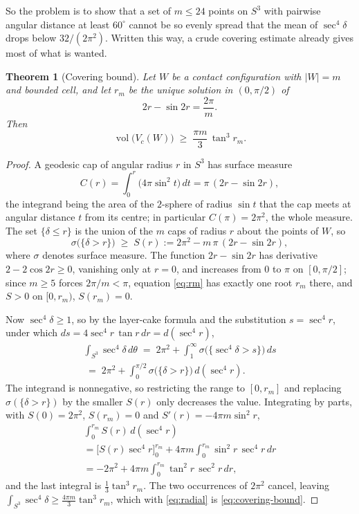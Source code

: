 \documentclass[11pt,reqno]{amsart}
\renewcommand{\_}{\origunderscore\allowbreak}
\numberwithin{equation}{section}
\theoremstyle{plain}
\newtheorem{thm}{Theorem}[section]
\theoremstyle{definition}
\theoremstyle{remark}
\DeclareMathOperator{\vol}{vol}
\begin{document}
So the problem is to show that a set of $m\le24$ points on $S^3$ with
pairwise angular distance at least $60^\circ$ cannot be so evenly spread
that the mean of $\sec^4\delta$ drops below $32/(2\pi^2)$. Written this
way, a crude covering estimate already gives most of what is wanted.

\begin{thm}[Covering bound]\label{thm:covering-bound}
Let $W$ be a contact configuration with $|W|=m$ and bounded cell, and
let $r_m$ be the unique solution in $(0,\pi/2)$ of
\begin{equation}\label{eq:rm}
  2r-\sin2r=\frac{2\pi}{m} .
\end{equation}
Then
\begin{equation}\label{eq:covering-bound}
  \vol\bigl(V_c(W)\bigr)\;\ge\;\frac{\pi m}{3}\,\tan^3 r_m .
\end{equation}
\end{thm}

\begin{proof}
A geodesic cap of angular radius $r$ in $S^3$ has surface measure
\[
  C(r)=\int_0^r\bigl(4\pi\sin^2t\bigr)\,dt=\pi\,(2r-\sin2r),
\]
the integrand being the area of the $2$-sphere of radius $\sin t$ that
the cap meets at angular distance $t$ from its centre; in particular
$C(\pi)=2\pi^2$, the whole measure. The set $\{\delta\le r\}$ is the
union of the $m$ caps of radius $r$ about the points of $W$, so
\[
  \sigma\bigl(\{\delta>r\}\bigr)\;\ge\;S(r):=2\pi^2-m\,\pi\,(2r-\sin2r),
\]
where $\sigma$ denotes surface measure. The function $2r-\sin2r$ has
derivative $2-2\cos2r\ge0$, vanishing only at $r=0$, and increases from
$0$ to $\pi$ on $[0,\pi/2]$; since $m\ge5$ forces $2\pi/m<\pi$, equation
\eqref{eq:rm} has exactly one root $r_m$ there, and $S>0$ on $[0,r_m)$,
$S(r_m)=0$.

Now $\sec^4\delta\ge1$, so by the layer-cake formula and the
substitution $s=\sec^4r$, under which
$ds=4\sec^4r\,\tan r\,dr=d(\sec^4r)$,
\begin{multline*}
  \int_{S^3}\sec^4\delta\,d\theta
  \;=\;2\pi^2+\int_1^{\infty}\sigma\bigl(\{\sec^4\delta>s\}\bigr)\,ds\\
  \;=\;2\pi^2+\int_0^{\pi/2}\sigma\bigl(\{\delta>r\}\bigr)\,d(\sec^4r).
\end{multline*}
The integrand is nonnegative, so restricting the range to $[0,r_m]$ and
replacing $\sigma(\{\delta>r\})$ by the smaller $S(r)$ only decreases
the value. Integrating by parts, with $S(0)=2\pi^2$, $S(r_m)=0$ and
$S'(r)=-4\pi m\sin^2r$,
\begin{multline*}
  \int_0^{r_m}S(r)\,d(\sec^4r)\\
  =\bigl[S(r)\sec^4r\bigr]_0^{r_m}+4\pi m\int_0^{r_m}\sin^2r\,\sec^4r\,dr\\
  =-2\pi^2+4\pi m\int_0^{r_m}\tan^2r\,\sec^2r\,dr,
\end{multline*}
and the last integral is $\tfrac13\tan^3r_m$. The two occurrences of
$2\pi^2$ cancel, leaving
$\int_{S^3}\sec^4\delta\ge\tfrac{4\pi m}{3}\tan^3r_m$, which with
\eqref{eq:radial} is \eqref{eq:covering-bound}.
\end{proof}
\end{document}
